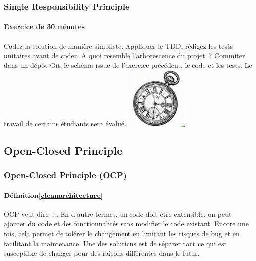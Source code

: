\documentclass{beamer}
\begin{document}
    \begin{frame}
        \transdissolve
        \frametitle{Single Responsibility Principle}
        \framesubtitle{Exercice \execcounterdispinc{} de 30 minutes}
        Codez la solution de manière simpliste.
        \bigbreak
        Appliquer le TDD, rédigez les tests unitaires avant de coder.
        \bigbreak
        A quoi resemble l'arborescence du projet~?
        \bigbreak
        Commiter dans un dépôt Git, le schéma issue de l'exercice précédent, le code et les tests.
        \bigbreak
        Le travail de certains étudiants sera évalué.
        \bigbreak
        \centering
        \includegraphics[width=3cm]{image/engraving-of-an-old-watch}
    \end{frame}

    \subsection{Open-Closed Principle}\label{subsec:mid-level-o}

    \begin{frame}
        \transdissolve
        \frametitle{Open-Closed Principle (OCP)}
        \framesubtitle{Définition\cref{cleanarchitecture}}
        OCP veut dire~: .
        \bigbreak
        En d'autre termes, un code doit être extensible, on peut ajouter du code et des fonctionnalités sans modifier le code existant.
        Encore une fois, cela permet de tolérer le changement en limitant les risques de bug et en facilitant la maintenance.
        \bigbreak
        Une des solutions est de séparer tout ce qui est susceptible de changer pour des raisons différentes dans le futur.
    \end{frame}
\end{document}
